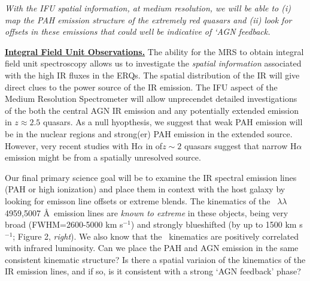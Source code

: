 
\smallskip
\smallskip
\noindent
{\it With the IFU spatial information, at medium resolution, we will be able to 
(i) map the PAH emission structure of the extremely red quasars and (ii) look 
for offsets in these emissions that could well be indicative of `AGN feedback.}

\smallskip
\smallskip
\noindent
{\bf \underline{Integral Field Unit Observations.}}
The ability for the MRS to obtain integral field unit spectroscopy
allows us to investigate the {\it spatial information} associated with
the high IR fluxes in the ERQs. The spatial distribution of the IR
will give direct clues to the power source of the IR emission.  The
IFU aspect of the Medium Resolution Spectrometer will allow
unprecendet detailed investigations of the both the central AGN IR
emission and any potentially extended emission in $z\approx2.5$
quasars.  As a null hyopthesis, we suggest that weak PAH emission will
be in the nuclear regions and strong(er) PAH emission in the extended
source. However, very recent studies with H$\alpha$ in of$z\sim2$
quasars suggest that narrow H$\alpha$ emission might be from a
spatially unresolved source.

\smallskip \smallskip
\noindent 
Our final primary science goal will be to examine the IR spectral
emission lines (PAH or high ionization) and place them in context with
the host galaxy by looking for emisson line offsets or extreme blends.
The kinematics of the \oiii\ $\lambda \lambda$4959,5007 \AA\ emission
lines are {\it known to extreme} in these objects, being very broad
(FWHM=2600-5000 km s$^{-1}$) and strongly blueshifted (by up to 1500
km s$^{-1}$; Figure 2, {\it right}). We also know that the \oiii\
kinematics are positively correlated with infrared luminosity.  Can we
place the PAH and AGN emission in the same consistent kinematic
structure?  Is there a spatial variaion of the kinematics of the IR
emission lines, and if so, is it consistent with a strong `AGN
feedback' phase?


